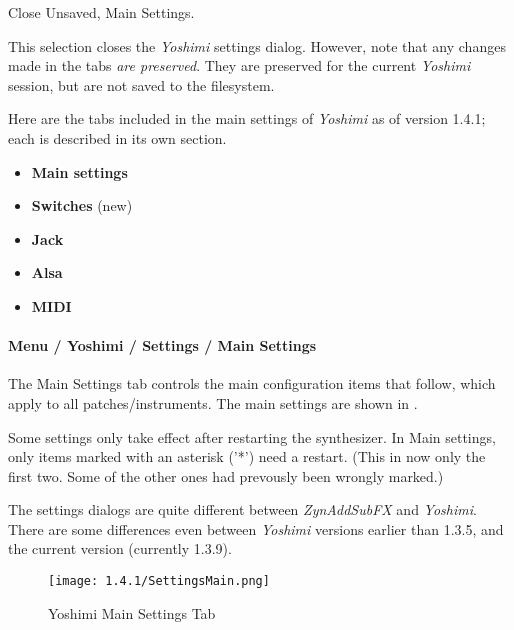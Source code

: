    Close Unsaved, Main Settings.

   This selection closes the \textsl{Yoshimi} settings dialog.
   However, note that any changes made in the tabs
   \textsl{are preserved}.  They are preserved for the current
   \textsl{Yoshimi} session, but are not saved to the filesystem.

   Here are the tabs included in the main settings of \textsl{Yoshimi}
   as of version 1.4.1; each is described in its own section.

   \begin{itemize}
      \item \textbf{Main settings}
      \item \textbf{Switches} (new)
      \item \textbf{Jack}
      \item \textbf{Alsa}
      \item \textbf{MIDI}
   \end{itemize}

\paragraph{Menu / Yoshimi / Settings / Main Settings}
\label{paragraph:menu_yoshimi_settings_main_settings}

   The Main Settings tab controls the main configuration items that
   follow, which apply to all patches/instruments.
   The main settings are shown in
   .

   Some settings only take effect after restarting the synthesizer.
   In Main settings, only items marked with an asterisk ('*')
   need a restart. 
   (This in now only the first two. Some of the other ones had
   prevously been wrongly marked.)

   The settings dialogs are quite different between \textsl{ZynAddSubFX} and
   \textsl{Yoshimi}.  There are some differences even between
   \textsl{Yoshimi} versions earlier than 1.3.5, and the current version
   (currently 1.3.9).

\begin{figure}[H]
   \centering 
   \texttt{[image: 1.4.1/SettingsMain.png]}
   \caption{Yoshimi Main Settings Tab}
   \label{fig:yoshimi_main_settings_tab}
\end{figure}


